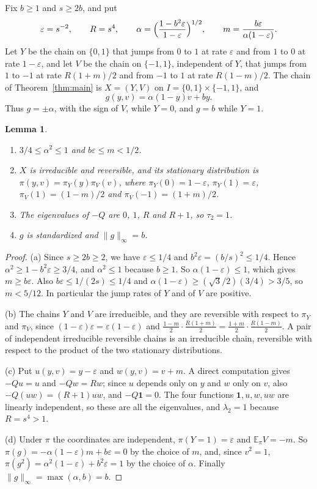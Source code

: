\documentclass[11pt]{amsart}
\newtheorem{lemma}{Lemma}
\theoremstyle{remark}
\numberwithin{equation}{section}
\newcommand{\E}{\mathbb E}
\begin{document}
Fix $b\ge1$ and $s\ge2b$, and put
\[
\varepsilon=s^{-2},\qquad R=s^4,\qquad \alpha=\Bigl(\frac{1-b^2\varepsilon}{1-\varepsilon}\Bigr)^{1/2},\qquad m=\frac{b\varepsilon}{\alpha(1-\varepsilon)} .
\]
Let $Y$ be the chain on $\{0,1\}$ that jumps from $0$ to $1$ at rate $\varepsilon$ and from $1$ to $0$ at rate $1-\varepsilon$, and let $V$ be the chain on $\{-1,1\}$, independent of $Y$, that jumps from $1$ to $-1$ at rate $R(1+m)/2$ and from $-1$ to $1$ at rate $R(1-m)/2$. The chain of Theorem~\ref{thm:main} is $X=(Y,V)$ on $I=\{0,1\}\times\{-1,1\}$, and
\[
g(y,v)=\alpha(1-y)v+by .
\]
Thus $g=\pm\alpha$, with the sign of $V$, while $Y=0$, and $g=b$ while $Y=1$.

\begin{lemma}\label{lem:chain}
\begin{enumerate}[label=\textup{(\alph*)}]
\item $3/4\le\alpha^2\le1$ and $b\varepsilon\le m<1/2$.
\item $X$ is irreducible and reversible, and its stationary distribution is $\pi(y,v)=\pi_Y(y)\pi_V(v)$, where $\pi_Y(0)=1-\varepsilon$, $\pi_Y(1)=\varepsilon$, $\pi_V(1)=(1-m)/2$ and $\pi_V(-1)=(1+m)/2$.
\item The eigenvalues of $-Q$ are $0$, $1$, $R$ and $R+1$, so $\tau_2=1$.
\item $g$ is standardized and $\|g\|_\infty=b$.
\end{enumerate}
\end{lemma}

\begin{proof}
(a) Since $s\ge2b\ge2$, we have $\varepsilon\le1/4$ and $b^2\varepsilon=(b/s)^2\le1/4$. Hence $\alpha^2\ge1-b^2\varepsilon\ge3/4$, and $\alpha^2\le1$ because $b\ge1$. So $\alpha(1-\varepsilon)\le1$, which gives $m\ge b\varepsilon$. Also $b\varepsilon\le1/(2s)\le1/4$ and $\alpha(1-\varepsilon)\ge(\sqrt3/2)(3/4)>3/5$, so $m<5/12$. In particular the jump rates of $Y$ and of $V$ are positive.

(b) The chains $Y$ and $V$ are irreducible, and they are reversible with respect to $\pi_Y$ and $\pi_V$, since $(1-\varepsilon)\varepsilon=\varepsilon(1-\varepsilon)$ and $\frac{1-m}2\cdot\frac{R(1+m)}2=\frac{1+m}2\cdot\frac{R(1-m)}2$. A pair of independent irreducible reversible chains is an irreducible chain, reversible with respect to the product of the two stationary distributions.

(c) Put $u(y,v)=y-\varepsilon$ and $w(y,v)=v+m$. A direct computation gives $-Qu=u$ and $-Qw=Rw$; since $u$ depends only on $y$ and $w$ only on $v$, also $-Q(uw)=(R+1)uw$, and $-Q\mathbf 1=0$. The four functions $\mathbf 1,u,w,uw$ are linearly independent, so these are all the eigenvalues, and $\lambda_2=1$ because $R=s^4>1$.

(d) Under $\pi$ the coordinates are independent, $\pi(Y=1)=\varepsilon$ and $\E_\pi V=-m$. So $\pi(g)=-\alpha(1-\varepsilon)m+b\varepsilon=0$ by the choice of $m$, and, since $v^2=1$, $\pi(g^2)=\alpha^2(1-\varepsilon)+b^2\varepsilon=1$ by the choice of $\alpha$. Finally $\|g\|_\infty=\max(\alpha,b)=b$.
\end{proof}
\end{document}

